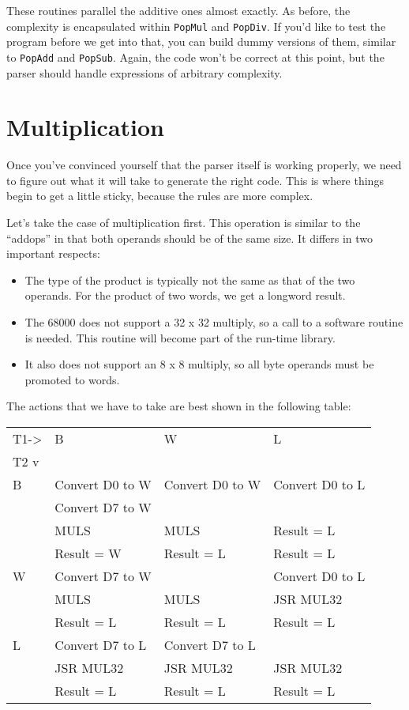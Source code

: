 These routines parallel the additive  ones  almost  exactly. As before, the complexity is encapsulated within {\tt PopMul}  and {\tt PopDiv}. If  you'd  like  to test the program before we get into that, you can build dummy versions of them, similar to  {\tt PopAdd} and {\tt PopSub}. Again, the code won't be correct at this point, but  the  parser should handle expressions of arbitrary complexity.

\section{Multiplication}

Once you've  convinced yourself that the parser itself is working properly, we need to figure out what it will take to generate the right code. This is where  things  begin to get a little sticky, because the rules are more complex.

Let's take the case of multiplication first. This  operation is similar to the ``addops'' in that both operands should  be  of  the same size. It differs in two important respects:

\begin{itemize}
\item	The type of the product is typically not the same as that of the  two  operands. For the product of two words, we get a longword result.
\item	The 68000 does  not support a 32 x 32 multiply, so a call to a software routine is needed. This routine will become part of the run-time library.
\item	It also does  not  support  an  8  x 8 multiply, so all byte operands must be promoted to words.
\end{itemize}

The actions that we have to take are best shown in  the following table:

\medskip
\begin{tabular}{llll}\hline
T1-> & B & W & L \\
T2 v & & & \\\hline
B	& Convert D0 to W & Convert D0 to W & Convert D0 to L \\
    & Convert D7 to W &  & \\
    & MULS            & MULS  & Result = L \\
    & Result = W	  & Result = L &  Result = L \\ \hline
W   & Convert D7 to W &            &  Convert D0 to L \\
	& MULS            & MULS       &  JSR MUL32 \\
    & Result = L	  & Result = L &  Result = L \\
L   & Convert D7 to L & Convert D7 to L &  \\ \hline
    & JSR MUL32       & JSR MUL32 & JSR MUL32 \\
    & Result = L	  & Result = L & Result = L \\ \hline
\end{tabular}
\bigskip


